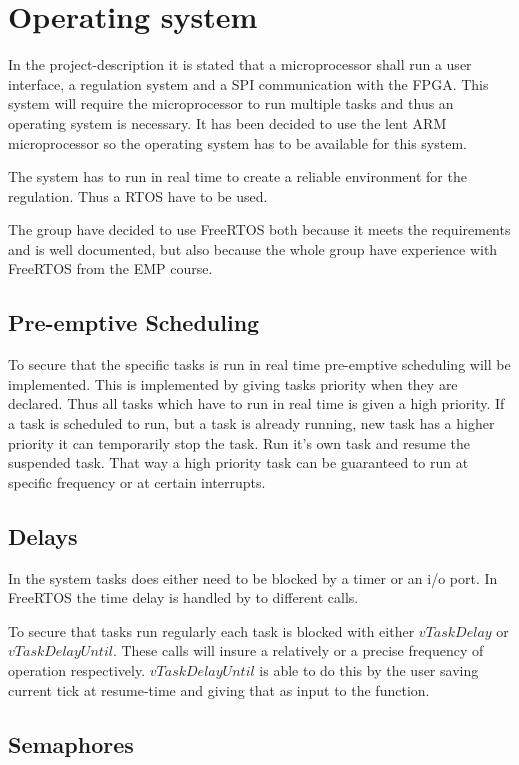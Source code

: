 \chapter{Operating system}\label{chap:os}


In the project-description it is stated that a microprocessor shall run a user interface, a regulation system and a SPI communication with the FPGA. This system will require the microprocessor to run multiple tasks and thus an operating system is necessary. It has been decided to use the lent ARM microprocessor so the operating system has to be available for this system.

The system has to run in real time to create a reliable environment for the regulation. Thus a RTOS have to be used.

The group have decided to use FreeRTOS both because it meets the requirements and is well documented, but also because the whole group have experience with FreeRTOS from the EMP course.

\section{ Pre-emptive Scheduling }

To secure that the specific tasks is run in real time pre-emptive scheduling will be implemented. This is implemented by giving tasks priority when they are declared. Thus all tasks which have to run in real time is given a high priority. If a task is scheduled to run, but a task is already running, new task has a higher priority it can temporarily stop the task. Run it's own task and resume the suspended task. That way a high priority task can be guaranteed to run at specific frequency or at certain interrupts.

\section{ Delays  }

In the system tasks does either need to be blocked by a timer or an i/o port. In FreeRTOS the time delay is handled by to different calls. 

To secure that tasks run regularly each task is blocked with either $vTaskDelay$ or $vTaskDelayUntil$. These calls will insure a relatively or a precise frequency of operation respectively. $vTaskDelayUntil$ is able to do this by the user saving current tick at resume-time and giving that as input to the function.
 
\section{ Semaphores }


